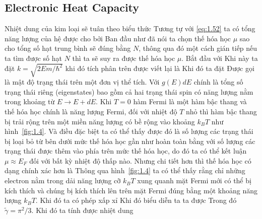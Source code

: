 \subsection{Electronic Heat Capacity}
Nhiệt dung của kim loại sẽ tuân theo biểu thức
Tương tự với \eqref{eq:1.52} ta có tổng năng lượng của hệ được cho bởi
Ban đầu như đã nói ta chọn thế hóa học $\mu$ sao cho tổng số hạt trung bình sẽ đúng bằng $N$, thông qua đó một cách gián tiếp nếu ta tìm được số hạt $N$ thì ta sẽ suy ra được thế hóa học $\mu$. Bắt đầu với
Khi này ta đặt $k = \sqrt{2Em/\hbar^2}$ khi đó tích phân trên được viết lại là
Khi đó ta đặt
Được gọi là mật độ trạng thái trên một đơn vị thể tích. Với $g(E)dE$ chính là tổng số trạng thái riêng (eigenstates) bao gồm cả hai trạng thái spin có năng lượng nằm trong khoảng từ $E \rightarrow E + dE$. Khi $T = 0$ hàm Fermi là một hàm bậc thang và thế hóa học chính là năng lượng Fermi, đối với nhiệt độ $T$ nhỏ thì hàm bậc thang bị trải rộng trên một miền năng lượng có bề rộng vào khoảng $k_BT$ như hình~\ref{fig:1.4}.
Và điều đặc biệt ta có thể thấy được đó là số lượng các trạng thái bị loại bỏ từ bên dưới mức thế hóa học gần như hoàn toàn bằng với số lượng các trạng thái được thêm vào phía trên mức thế hóa học, do đó ta có thể kết luận $\mu \approx E_F$ đối với bất kỳ nhiệt độ thấp nào. Nhưng chi tiết hơn thì thế hóa học có dạng chính xác hơn là
Thông qua hình~\ref{fig:1.4} ta có thể thấy rằng chỉ những electron nằm trong dải năng lượng cỡ $k_BT$ xung quanh mặt Fermi mới có thể bị kích thích và chúng bị kích thích lên trên mặt Fermi đúng bằng một khoảng năng lượng $k_BT$. Khi đó ta có phép xấp xỉ
Khi đó biểu diễn ta ta được
Trong đó $\tilde{\gamma} = \pi^2/3$. Khi đó ta tính được nhiệt dung

